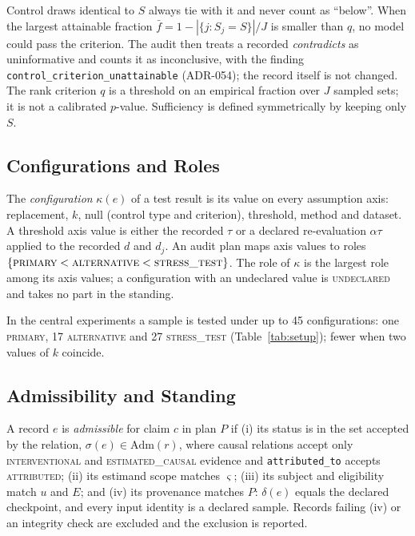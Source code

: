 Control draws identical to $S$ always tie with it and never count as ``below''. When the largest attainable fraction $\bar f=1-|\{j:S_j=S\}|/J$ is smaller than $q$, no model could pass the criterion. The audit then treats a recorded \emph{contradicts} as uninformative and counts it as inconclusive, with the finding \texttt{control\_criterion\_unattainable} (ADR-054); the record itself is not changed. The rank criterion $q$ is a threshold on an empirical fraction over $J$ sampled sets; it is not a calibrated $p$-value. Sufficiency is defined symmetrically by keeping only $S$.

\subsection{Configurations and Roles}

\begin{definition}
The \emph{configuration} $\kappa(e)$ of a test result is its value on every assumption axis: replacement, $k$, null (control type and criterion), threshold, method and dataset. A threshold axis value is either the recorded $\tau$ or a declared re-evaluation $\alpha\tau$ applied to the recorded $d$ and $d_j$. An audit plan maps axis values to roles $\{\textsc{primary}<\textsc{alternative}<\textsc{stress\_test}\}$. The role of $\kappa$ is the largest role among its axis values; a configuration with an undeclared value is \textsc{undeclared} and takes no part in the standing.
\end{definition}

In the central experiments a sample is tested under up to 45 configurations: one \textsc{primary}, 17 \textsc{alternative} and 27 \textsc{stress\_test} (Table~\ref{tab:setup}); fewer when two values of $k$ coincide.

\subsection{Admissibility and Standing}

\begin{definition}
A record $e$ is \emph{admissible} for claim $c$ in plan $P$ if (i) its status is in the set accepted by the relation, $\sigma(e)\in\mathrm{Adm}(r)$, where causal relations accept only \textsc{interventional} and \textsc{estimated\_causal} evidence and \texttt{attributed\_to} accepts \textsc{attributed}; (ii) its estimand scope matches $\varsigma$; (iii) its subject and eligibility match $u$ and $E$; and (iv) its provenance matches $P$: $\delta(e)$ equals the declared checkpoint, and every input identity is a declared sample. Records failing (iv) or an integrity check are excluded and the exclusion is reported.
\end{definition}

